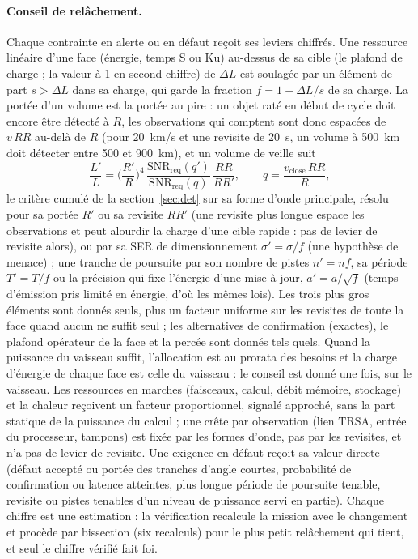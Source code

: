 \documentclass[11pt,a4paper]{article}
\begin{document}
\paragraph{Conseil de relâchement.} Chaque contrainte en alerte ou en défaut reçoit ses leviers chiffrés. Une ressource
linéaire d'une face (énergie, temps S ou Ku) au-dessus de sa cible (le plafond de charge ; la valeur à 1 en second
chiffre) de $\Delta L$ est soulagée par un élément de part $s>\Delta L$ dans sa charge, qui garde la fraction
$f=1-\Delta L/s$ de sa charge. La portée d'un volume est la portée au pire : un objet raté en début de cycle doit encore
être détecté à $R$, les observations qui comptent sont donc espacées de $v\,RR$ au-delà de $R$ (pour 20~km/s et une
revisite de 20~s, un volume à 500~km doit détecter entre 500 et 900~km), et un volume de veille suit
\[ \frac{L'}{L}=\Big(\frac{R'}{R}\Big)^4\,\frac{\mathrm{SNR}_\mathrm{req}(q')}{\mathrm{SNR}_\mathrm{req}(q)}\,
\frac{RR}{RR'},\qquad q=\frac{v_\mathrm{close}\,RR}{R}, \]
le critère cumulé de la section~\ref{sec:det} sur sa forme d'onde principale, résolu pour sa portée $R'$ ou sa
revisite $RR'$ (une revisite plus longue espace les observations et peut alourdir la charge d'une cible rapide : pas de
levier de revisite alors), ou par sa SER de dimensionnement $\sigma'=\sigma/f$ (une hypothèse de menace) ; une tranche de poursuite par son nombre de pistes
$n'=nf$, sa période $T'=T/f$ ou la précision qui fixe l'énergie d'une mise à jour, $a'=a/\sqrt f$ (temps d'émission
pris limité en énergie, d'où les mêmes lois). Les trois plus gros éléments sont donnés seuls, plus un facteur uniforme
sur les revisites de toute la face quand aucun ne suffit seul ; les alternatives de confirmation (exactes), le plafond
opérateur de la face et la percée sont donnés tels quels. Quand la puissance du vaisseau suffit, l'allocation est au
prorata des besoins et la charge d'énergie de chaque face est celle du vaisseau : le conseil est donné une fois, sur le
vaisseau. Les ressources en marches (faisceaux, calcul, débit mémoire, stockage) et la chaleur reçoivent un facteur
proportionnel, signalé approché, sans la part statique de la puissance du calcul ; une crête par observation (lien
TRSA, entrée du processeur, tampons) est fixée par les formes d'onde, pas par les revisites, et n'a pas de levier de
revisite. Une exigence en défaut reçoit sa valeur directe (défaut accepté ou portée des tranches d'angle courtes,
probabilité de confirmation ou latence atteintes, plus longue période de poursuite tenable, revisite ou pistes tenables
d'un niveau de puissance servi en partie). Chaque chiffre est une estimation : la vérification recalcule la mission avec
le changement et procède par bissection (six recalculs) pour le plus petit relâchement qui tient, et seul le chiffre
vérifié fait foi.
\end{document}
